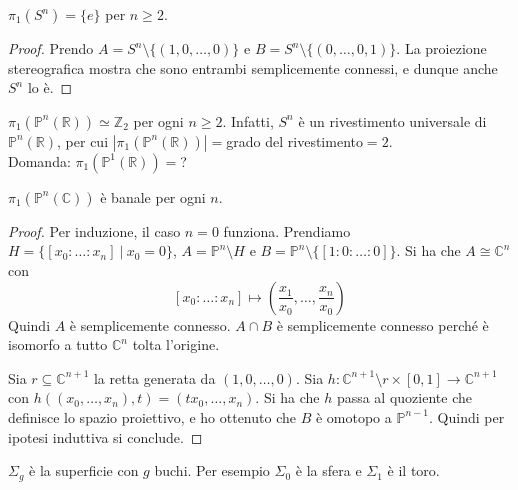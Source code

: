 \begin{ex}
    $\pi_1(S^n)=\{e\}$ per $n\geq 2$.
\end{ex}
\begin{proof}
    Prendo $A=S^n\setminus\{(1,0,\dots,0)\}$ e $B=S^n\setminus\{(0,\dots,0,1)\}$. La proiezione stereografica mostra che sono entrambi semplicemente connessi, e dunque anche $S^n$ lo \`e.
\end{proof}

\begin{oss}
  $\pi_1(\mathbb{P}^n(\mathbb{R})) \simeq \mathbb{Z}_2$ per ogni $n \ge 2$. Infatti, $S^n$ è un rivestimento universale di $\mathbb{P}^n(\mathbb{R})$, per cui $|\pi_1(\mathbb{P}^n(\mathbb{R}))|=$grado del rivestimento$=2$. \\
  Domanda: $\pi_1(\mathbb{P}^1(\mathbb{R}))=$?
\end{oss}

\begin{ex}
    $\pi_1(\mathbb{P}^n(\mathbb{C}))$ \`e banale per ogni $n$.
\end{ex}
\begin{proof}
    Per induzione, il caso $n=0$ funziona. Prendiamo $H = \{[x_0:\dots:x_n]\ | \ x_0=0\}$, $A = \mathbb{P}^n\setminus H$ e $B= \mathbb{P}^n\setminus \{[1:0:\dots:0]\}$. Si ha che $A\cong \mathbb{C}^n$ con
    \[
        [x_0:\dots:x_n]\mapsto\left(\frac{x_1}{x_0},\dots, \frac{x_n}{x_0}\right)
    \]
    Quindi $A$ \`e semplicemente connesso.
    $A\cap B$ \`e semplicemente connesso perch\'e \`e isomorfo a tutto $\mathbb{C}^n$ tolta l'origine.

    Sia $r\subseteq\mathbb{C}^{n+1}$ la retta generata da $(1,0,\dots, 0)$.
    Sia $h\colon\mathbb{C}^{n+1}\setminus r\times [0,1] \longrightarrow \mathbb{C}^{n+1}$ con $h((x_0, \dots, x_n), t)=(tx_0, \dots, x_n)$.
    Si ha che $h$ passa al quoziente che definisce lo spazio proiettivo, e ho ottenuto che $B$ \`e omotopo a $\mathbb{P}^{n-1}$. Quindi per ipotesi induttiva si conclude.
\end{proof}

\begin{defn}
    $\Sigma_g$ \`e la superficie con $g$ buchi. Per esempio $\Sigma_0$ \`e la sfera e $\Sigma_1$ \`e il toro.
\end{defn}

